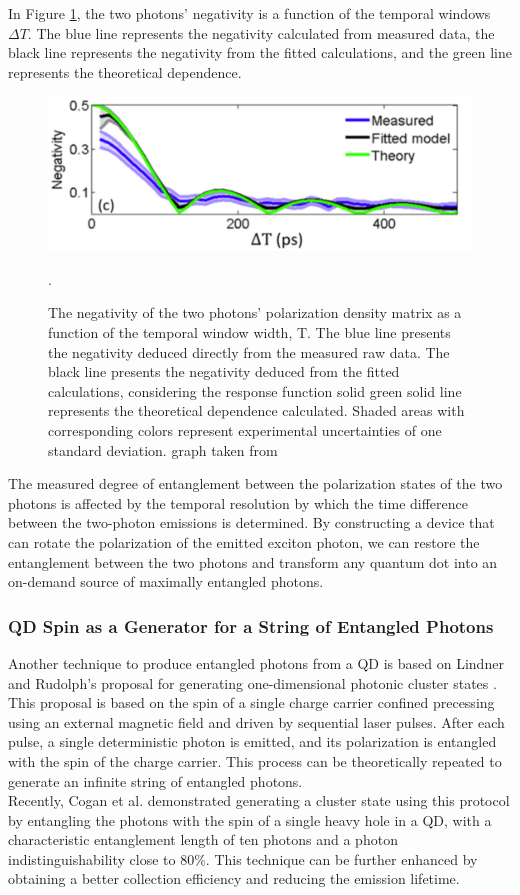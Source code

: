 In Figure \ref{Entanglement2}, the two photons' negativity is a function of the temporal windows $\Delta T$. The blue line represents the negativity calculated from measured data, the black line represents the negativity from the fitted calculations, and the green line represents the theoretical dependence. 
 \begin{figure}[H]
	\centering
	\includegraphics[scale=0.45]{figures/Entanglement_Integration2.png}
	\caption{The negativity of the two photons' polarization density matrix as a function of the temporal window width, T. The blue line presents the negativity deduced directly from the measured raw data. The black line presents the negativity deduced from the fitted calculations, considering the response function solid green solid line represents the theoretical dependence calculated. Shaded areas with corresponding colors represent experimental uncertainties of one standard deviation. graph taken from \cite{Winik2017}}.
   \label{Entanglement2}
\end{figure} 
The measured degree of entanglement between the polarization states of the two photons is affected by the temporal resolution by which the time difference between the two-photon emissions is determined. By constructing a device that can rotate the polarization of the emitted exciton photon, we can restore the entanglement between the two photons and transform any quantum dot into an on-demand source of maximally entangled photons.
\subsubsection{QD Spin as a Generator for a String of Entangled Photons}
Another technique to produce entangled photons from a QD is based on Lindner and Rudolph's proposal for generating one-dimensional photonic cluster states \cite{Linder2009}. This proposal is based on the spin of a single charge carrier confined precessing using an external magnetic field and driven by sequential laser pulses. After each pulse, a  single deterministic photon is emitted, and its polarization is entangled with the spin of the charge carrier. This process can be theoretically repeated to generate an infinite string of entangled photons.\\
Recently, Cogan et al.\cite{Cogan2023} demonstrated generating a cluster state using this protocol by entangling the photons with the spin of a single heavy hole in a QD, with a characteristic entanglement length of ten photons and a photon indistinguishability close to $80 \%$. This technique can be further enhanced by obtaining a better collection efficiency and reducing the emission lifetime.   
